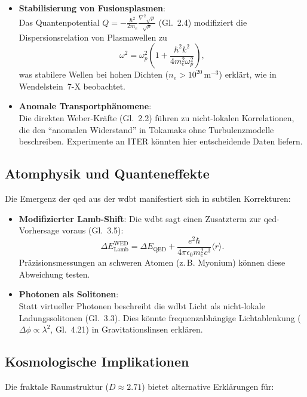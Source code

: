 \begin{itemize}  
    \item \textbf{Stabilisierung von Fusionsplasmen}:\\Das Quantenpotential $Q = -\frac{\hbar^2}{2m_e} \frac{\nabla^2 \sqrt{\rho}}{\sqrt{\rho}}$ (Gl.~2.4) modifiziert die Dispersionsrelation von Plasmawellen zu  
    \[
    \omega^2 = \omega_p^2 \left(1 + \frac{\hbar^2 k^2}{4m_e^2 \omega_p^2}\right),  
    \]  
    was stabilere Wellen bei hohen Dichten ($n_e > 10^{20}\, \text{m}^{-3}$) erklärt, wie in Wendelstein~7-X beobachtet.  

    \item \textbf{Anomale Transportphänomene}:\\Die direkten Weber-Kräfte (Gl.~2.2) führen zu nicht-lokalen Korrelationen, die den \enquote{anomalen Widerstand} in Tokamaks ohne Turbulenzmodelle beschreiben. Experimente an ITER könnten hier entscheidende Daten liefern.
\end{itemize}  

\subsection{Atomphysik und Quanteneffekte}  
Die Emergenz der \gls{qed} aus der \gls{wdbt} manifestiert sich in subtilen Korrekturen:  

\begin{itemize}  
    \item \textbf{Modifizierter Lamb-Shift}:  
    Die \gls{wdbt} sagt einen Zusatzterm zur \gls{qed}-Vorhersage voraus (Gl.~3.5):
    \[
    \Delta E_{\text{Lamb}}^{\text{WED}} = \Delta E_{\text{QED}} + \frac{e^2 \hbar}{4\pi \epsilon_0 m_e^2 c^3} \langle r \rangle.  
    \]  
    Präzisionsmessungen an schweren Atomen (z.\,B. Myonium) können diese Abweichung testen.  

    \item \textbf{Photonen als Solitonen}:\\Statt virtueller Photonen beschreibt die \gls{wdbt} Licht als nicht-lokale Ladungssolitonen (Gl.~3.3). Dies könnte frequenzabhängige Lichtablenkung ($\Delta \phi \propto \lambda^2$, Gl.~4.21) in Gravitationslinsen erklären.  
\end{itemize}  

\subsection{Kosmologische Implikationen}  
Die fraktale Raumstruktur ($D \approx 2.71$) bietet alternative Erklärungen für:  

